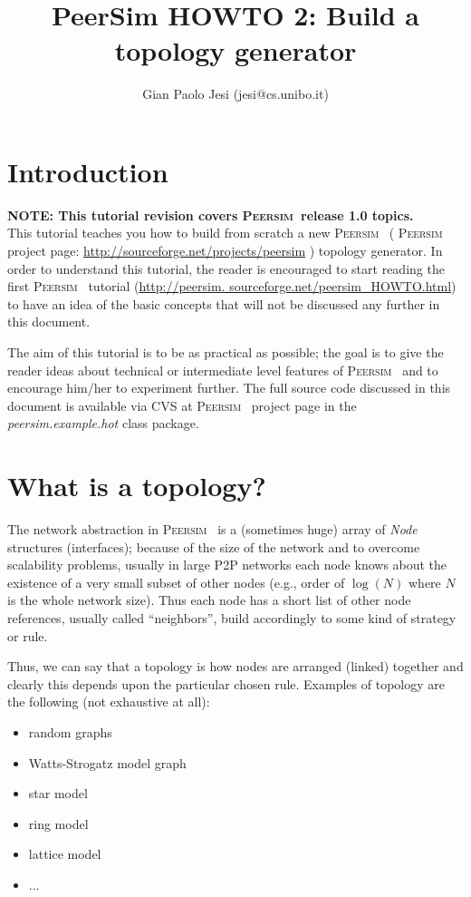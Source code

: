 \documentclass[a4paper,11pt]{article}
\title{PeerSim HOWTO 2: Build a topology generator}
\author{Gian Paolo Jesi (jesi@cs.unibo.it)}
\newcommand{\id}[1]{{\scshape\small #1}}
\newcommand{\psim}{\id{Peersim}}
\begin{document}
\maketitle

\section{Introduction}

\textbf{NOTE: This tutorial revision covers \psim~release 1.0
  topics.}\\

This tutorial teaches you how to build from scratch a new \psim~
( \psim~ project page: \url{http://sourceforge.net/projects/peersim}
) topology generator. In order to understand this tutorial, the reader
is encouraged to start reading the first \psim~ tutorial 
(\url{http://peersim. sourceforge.net/peersim_HOWTO.html}) 
to have an idea of the basic concepts that will not be discussed any
further in this document. 

The aim of this tutorial is to be as practical as possible; the goal
is to give the reader ideas about technical or intermediate level
features of \psim~ and to encourage him/her to experiment further.
The full source code discussed in this document is available via CVS
at \psim~ project page in the \emph{peersim.example.hot} class package.


\section{What is a topology?}

The network abstraction in \psim~ is a (sometimes huge) array of
\emph{Node} structures (interfaces); because of the size of the network
and to overcome scalability problems, usually in large P2P networks
each node knows about the existence of a very small subset of other
nodes (e.g., order of $\log(N)$ where $N$ is the whole network size). Thus
each node has a short list of other node references, usually called
``neighbors'', build accordingly to some kind of strategy
or rule. 

Thus, we can say that a topology is how nodes are arranged (linked)
together and clearly this depends upon the particular chosen rule.
Examples of topology are the following (not exhaustive at all): 

\begin{itemize}
\item random graphs 
\item Watts-Strogatz model graph 
\item star model 
\item ring model 
\item lattice model 
\item ...
\end{itemize}
\end{document}
